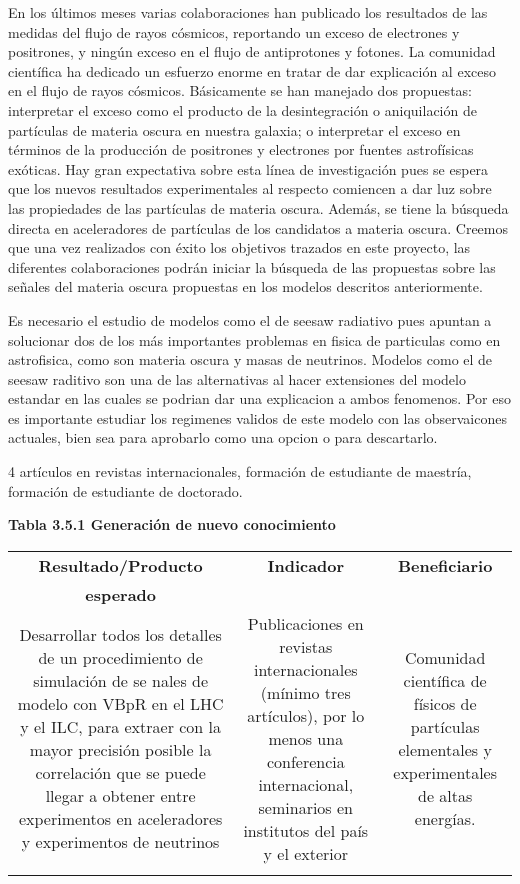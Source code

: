 \begin{ideas}
  \newpage{}
En los últimos meses varias colaboraciones han publicado los resultados de las medidas del flujo de rayos cósmicos, reportando un exceso de electrones y positrones, y ningún exceso en el flujo de antiprotones y fotones. 
La comunidad científica ha dedicado un esfuerzo enorme en tratar de dar explicación al exceso en el flujo de rayos cósmicos. Básicamente se han manejado dos propuestas: interpretar el exceso como el producto de la desintegración o aniquilación de partículas de materia oscura en nuestra galaxia; o interpretar el exceso en términos de la producción de positrones y electrones por fuentes astrofísicas exóticas. 
Hay gran expectativa sobre esta línea de investigación pues se espera que los nuevos resultados experimentales al respecto comiencen a dar luz sobre las propiedades de las partículas de materia oscura. Además, se tiene la  búsqueda directa en aceleradores de partículas de  los candidatos a materia oscura.
Creemos que una vez realizados con éxito los objetivos trazados en este proyecto,  las diferentes colaboraciones podrán iniciar la búsqueda de las propuestas sobre las señales del materia oscura propuestas en los modelos descritos anteriormente.





Es necesario el estudio de modelos como el de seesaw radiativo pues apuntan a solucionar dos de los más importantes problemas en fisica de particulas como en astrofisica, como son materia oscura y masas de neutrinos. Modelos como el de seesaw raditivo son una de las alternativas al hacer extensiones del modelo estandar en las cuales se podrian dar una explicacion a ambos fenomenos. Por eso es importante estudiar los regimenes validos de este modelo con las observaicones actuales, bien sea para aprobarlo como una opcion o para descartarlo.


4 artículos en revistas internacionales, formación de estudiante de
maestría, formación de estudiante de doctorado.

\textbf{Tabla 3.5.1 Generación de nuevo conocimiento}\\
\begin{tabular}{|c|c|c|}\hline
   \textbf{Resultado/Producto}&\textbf{Indicador} & \textbf{Beneficiario}\\
   \textbf{esperado}& & \\\hline
   \parbox[t]{4cm}{Desarrollar todos los detalles de un procedimiento de simulación de se nales de modelo con VBpR en el LHC y el ILC, para extraer con la mayor precisión posible la correlación que se puede llegar a obtener entre experimentos en aceleradores y experimentos de neutrinos}& \parbox[t]{4cm}{Publicaciones en revistas internacionales (mínimo tres artículos), por lo menos una conferencia internacional, seminarios en institutos del país y el exterior}& \parbox[t]{4cm}{Comunidad científica de físicos de partículas elementales y experimentales de altas energías.}\\\hline 
   & & \\\hline
 \end{tabular}


\end{ideas}
